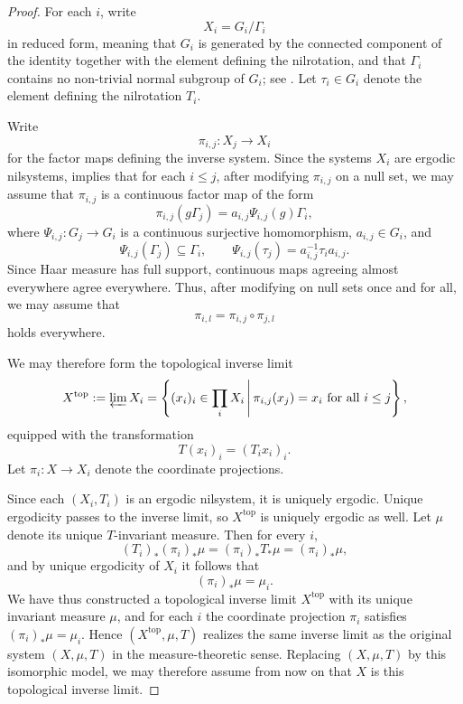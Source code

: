 \documentclass[12pt]{amsart}
\theoremstyle{plain}
\theoremstyle{definition}
\begin{document}
\begin{proof}
    For each $i$, write
    \[
    X_i=G_i/\Gamma_i
    \]
    in reduced form, meaning that $G_i$ is generated by the connected component of the identity together with the element defining the nilrotation, and that $\Gamma_i$ contains no non-trivial normal subgroup of $G_i$; see \cite[Chapter~11, Section~1]{hk-book}.
    Let $\tau_i\in G_i$ denote the element defining the nilrotation $T_i$.

    Write
    \[
    \pi_{i,j}\colon X_j\to X_i
    \]
    for the factor maps defining the inverse system.
    Since the systems $X_i$ are ergodic nilsystems, \cite[Chapter~13, Theorem~5]{hk-book} implies that for each $i\leq j$, after modifying $\pi_{i,j}$ on a null set, we may assume that $\pi_{i,j}$ is a continuous factor map of the form
    \[
    \pi_{i,j}(g\Gamma_j)=a_{i,j}\Psi_{i,j}(g)\Gamma_i,
    \]
    where $\Psi_{i,j}\colon G_j\to G_i$ is a continuous surjective homomorphism, $a_{i,j}\in G_i$, and
    \[
    \Psi_{i,j}(\Gamma_j)\subseteq \Gamma_i,
    \qquad
    \Psi_{i,j}(\tau_j)=a_{i,j}^{-1}\tau_i a_{i,j}.
    \]
    Since Haar measure has full support, continuous maps agreeing almost everywhere agree everywhere.
    Thus, after modifying on null sets once and for all, we may assume that
    \[
    \pi_{i,l}=\pi_{i,j}\circ \pi_{j,l}
    \]
    holds everywhere.

    We may therefore form the topological inverse limit
    \[
    X^{\mathrm{top}}:=\varprojlim X_i
    =\left\{(x_i)_i\in \prod_i X_i \,\middle|\, \pi_{i,j}(x_j)=x_i \text{ for all } i\leq j\right\},
    \]
    equipped with the transformation
    \[
    T(x_i)_i=(T_i x_i)_i.
    \]
    Let $\pi_i\colon X\to X_i$ denote the coordinate projections.

    Since each $(X_i,T_i)$ is an ergodic nilsystem, it is uniquely ergodic.
    Unique ergodicity passes to the inverse limit, so $X^{\mathrm{top}}$ is uniquely ergodic as well.
    Let $\mu$ denote its unique $T$-invariant measure.
    Then for every $i$,
    \[
    (T_i)_*(\pi_i)_*\mu = (\pi_i)_*T_*\mu = (\pi_i)_*\mu,
    \]
    and by unique ergodicity of $X_i$ it follows that
    \[
    (\pi_i)_*\mu=\mu_i.
    \]
    We have thus constructed a topological inverse limit $X^{\mathrm{top}}$ with its unique invariant measure $\mu$, and for each $i$ the coordinate projection $\pi_i$ satisfies $(\pi_i)_*\mu=\mu_i$. Hence $(X^{\mathrm{top}},\mu,T)$ realizes the same inverse limit as the original system $(X,\mu,T)$ in the measure-theoretic sense. Replacing $(X,\mu,T)$ by this isomorphic model, we may therefore assume from now on that $X$ is this topological inverse limit.


\end{proof}
\end{document}
